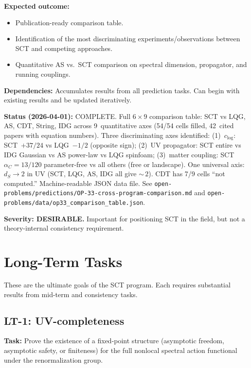 \documentclass[12pt,a4paper]{article}
\newcommand{\task}[1]{\noindent\textbf{Task:} #1\par}
\newcommand{\outcome}[1]{\noindent\textbf{Expected outcome:} #1\par}
\newcommand{\deps}[1]{\noindent\textbf{Dependencies:} #1\par}
\begin{document}
\outcome{
\begin{itemize}
  \item Publication-ready comparison table.
  \item Identification of the most discriminating experiments/observations
    between SCT and competing approaches.
  \item Quantitative AS vs.\ SCT comparison on spectral dimension,
    propagator, and running couplings.
\end{itemize}
}

\deps{Accumulates results from all prediction tasks. Can begin with
existing results and be updated iteratively.}

\textbf{Status (2026-04-01):} \textcolor{proven}{COMPLETE.}
Full $6 \times 9$ comparison table: SCT vs LQG, AS, CDT, String, IDG
across 9~quantitative axes (54/54 cells filled, 42~cited papers with
equation numbers).  Three discriminating axes identified:
(1)~$c_{\log}$: SCT~$+37/24$ vs LQG~$-1/2$ (opposite sign);
(2)~UV propagator: SCT entire vs IDG Gaussian vs AS power-law vs LQG
spinfoam; (3)~matter coupling: SCT $\alpha_C = 13/120$ parameter-free
vs all others (free or landscape).  One universal axis: $d_S \to 2$ in UV
(SCT, LQG, AS, IDG all give ${\sim}\,2$).  CDT has 7/9 cells ``not
computed.''  Machine-readable JSON data file.
See \texttt{open-problems/predictions/OP-33-cross-program-comparison.md}
and \texttt{open-problems/data/op33\_comparison\_table.json}.

\textbf{Severity: DESIRABLE.} Important for positioning SCT in the field,
but not a theory-internal consistency requirement.

\section{\textcolor{long}{Long-Term Tasks}}
\label{sec:long}

These are the ultimate goals of the SCT program. Each requires substantial
results from mid-term and consistency tasks.

\subsection{LT-1: UV-completeness}
\label{task:LT1}

\task{Prove the existence of a fixed-point structure (asymptotic freedom,
asymptotic safety, or finiteness) for the full nonlocal spectral action functional
under the renormalization group.}
\end{document}
